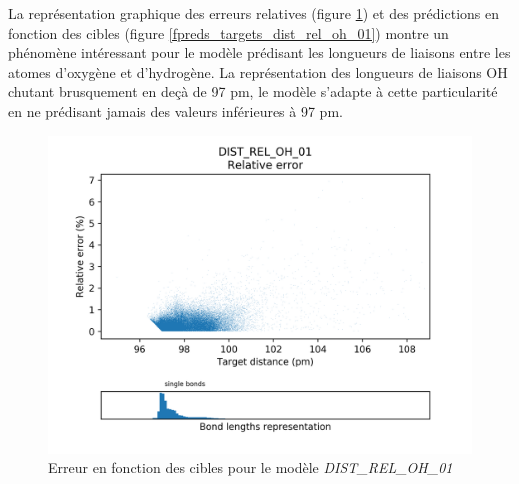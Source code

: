 \par La représentation graphique des erreurs relatives (figure \ref{fdistrib_err_rel_dist_rel_oh_01}) et des prédictions en fonction des cibles (figure \ref{fpreds_targets_dist_rel_oh_01}) montre un phénomène intéressant pour le modèle prédisant les longueurs de liaisons entre les atomes d'oxygène et d'hydrogène. La représentation des longueurs de liaisons OH chutant brusquement en deçà de 97 pm, le modèle s'adapte à cette particularité en ne prédisant jamais des valeurs inférieures à 97 pm.

\begin{figure}
	\centering
	
	\includegraphics[scale=0.7]{../figures/DIST_REL_OH_01/DIST_REL_OH_01_distrib_rmse_dist.png}	
	
	\caption{Erreur en fonction des cibles pour le modèle \emph{DIST\_REL\_OH\_01}}
	\label{fdistrib_err_rel_dist_rel_oh_01}
	\end{figure}
	
